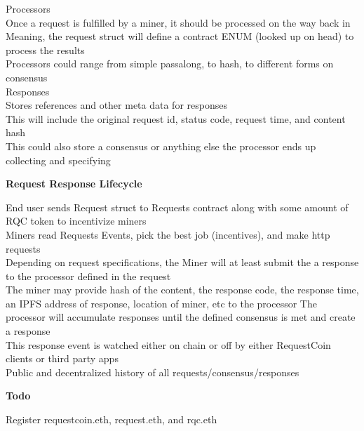 \documentclass[a4paper,10pt]{article}
\begin{document}
Processors \\
Once a request is fulfilled by a miner, it should be processed on the way back in \\
Meaning, the request struct will define a contract ENUM (looked up on head) to process the results \\
Processors could range from simple passalong, to hash, to different forms on consensus \\

Responses \\
Stores references and other meta data for responses \\
This will include the original request id, status code, request time, and content hash \\
This could also store a consensus or anything else the processor ends up collecting and specifying \\


\begin{center}
\textbf{Request Response Lifecycle }
\end{center}
End user sends Request struct to Requests contract along with some amount of RQC token to incentivize miners \\
Miners read Requests Events, pick the best job (incentives), and make http requests \\
Depending on request specifications, the Miner will at least submit the a response to the processor defined in the request \\
The miner may provide hash of the content, the response code, the response time, an IPFS address of response, location of miner, etc to the processor
The processor will accumulate responses until the defined consensus is met and create a response \\
This response event is watched either on chain or off by either RequestCoin clients or third party apps \\
Public and decentralized history of all requests/consensus/responses \\


\begin{center}
\textbf{Todo }
\end{center}
Register requestcoin.eth, request.eth, and rqc.eth \\
\end{document}
